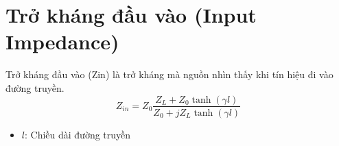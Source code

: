     \section{Trở kháng đầu vào (Input Impedance)}
        Trở kháng đầu vào (Zin) là trở kháng mà nguồn nhìn thấy khi tín hiệu đi vào đường truyền.
        \begin{equation}
            Z_{in} = Z_0 \frac{Z_L + Z_0 \tanh(\gamma l)}{Z_0 + jZ_L \tanh(\gamma l)}
            \label{eq:zin}    
        \end{equation}
        
        \begin{itemize}
            \item $l$: Chiều dài đường truyền
        \end{itemize}